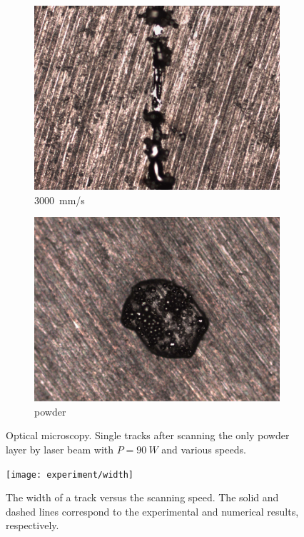 \documentclass{article}
\begin{document}
\begin{figure}
\begin{subfigure}[b]{0.24\textwidth}
        \includegraphics[width=\textwidth]{experiment/photos/90W_V3000}
        \caption{\SI{3000}{mm/s}}
    \end{subfigure}\:
    \begin{subfigure}[b]{0.24\textwidth}
        \includegraphics[width=\textwidth]{experiment/photos/powder}
        \caption{powder}
    \end{subfigure}
    \caption{
        Optical microscopy.
        Single tracks after scanning the only powder layer by laser beam
        with \(P=\SI{90}{W}\) and various speeds.
    }
    \label{fig:3d:experiment}
\end{figure}

\begin{figure}
    \centering
    \texttt{[image: experiment/width]}
    \caption{
        The width of a track versus the scanning speed.
        The solid and dashed lines correspond to the experimental and numerical results, respectively.
    }\label{fig:3d:width}
\end{figure}
\end{document}
